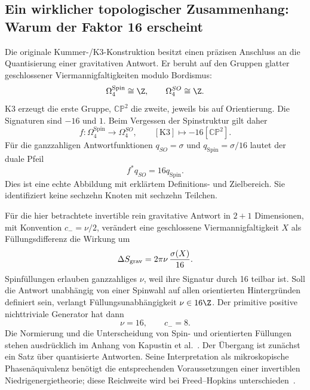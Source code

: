\subsection{Ein wirklicher topologischer Zusammenhang: Warum der Faktor 16 erscheint}
\label{sec:bordism16}
Die originale Kummer-/K3-Konstruktion besitzt einen präzisen Anschluss an die Quantisierung einer gravitativen Antwort. Er beruht auf den Gruppen glatter geschlossener Viermannigfaltigkeiten modulo Bordismus:
\begin{equation}
\Omega_4^{\mathrm{Spin}}\cong\Z,\qquad
\Omega_4^{SO}\cong\Z.
\end{equation}
K3 erzeugt die erste Gruppe, $\mathbb{CP}^2$ die zweite, jeweils bis auf Orientierung. Die Signaturen sind $-16$ und $1$. Beim Vergessen der Spinstruktur gilt daher
\begin{equation}\label{eq:forgetspin}
f:\Omega_4^{\mathrm{Spin}}\longrightarrow\Omega_4^{SO},
\qquad [\mathrm{K3}]\longmapsto-16[\mathbb{CP}^2].
\end{equation}
Für die ganzzahligen Antwortfunktionen $q_{SO}=\sigma$ und $q_{\mathrm{Spin}}=\sigma/16$ lautet der duale Pfeil
\begin{equation}
f^*q_{SO}=16q_{\mathrm{Spin}}.
\end{equation}
Dies ist eine echte Abbildung mit erklärtem Definitions- und Zielbereich. Sie identifiziert keine sechzehn Knoten mit sechzehn Teilchen.

Für die hier betrachtete invertible rein gravitative Antwort in $2+1$ Dimensionen, mit Konvention $c_-=\nu/2$, verändert eine geschlossene Viermannigfaltigkeit $X$ als Füllungsdifferenz die Wirkung um
\begin{equation}\label{eq:gravextension}
\Delta S_{\rm grav}=2\pi\nu\,\frac{\sigma(X)}{16}.
\end{equation}
Spinfüllungen erlauben ganzzahliges $\nu$, weil ihre Signatur durch 16 teilbar ist. Soll die Antwort unabhängig von einer Spinwahl auf allen orientierten Hintergründen definiert sein, verlangt Füllungsunabhängigkeit $\nu\in16\Z$. Der primitive positive nichttriviale Generator hat dann
\begin{equation}
\boxed{\nu=16,\qquad c_-=8.}
\end{equation}
Die Normierung und die Unterscheidung von Spin- und orientierten Füllungen stehen ausdrücklich im Anhang von Kapustin et al.~\cite{kapustinbordism}. Der Übergang ist zunächst ein Satz über quantisierte Antworten. Seine Interpretation als mikroskopische Phasenäquivalenz benötigt die entsprechenden Voraussetzungen einer invertiblen Niedrigenergietheorie; diese Reichweite wird bei Freed--Hopkins unterschieden~\cite{freedhopkins}.

